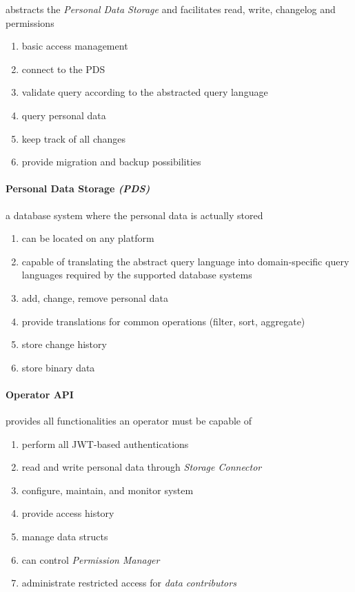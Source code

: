 \documentclass[12pt,english,a4paper,titlepage,cleardoublepage=empty,dottedtoc]{report}
\providecommand{\tightlist}{%
  \setlength{\itemsep}{0pt}\setlength{\parskip}{0pt}}
\begin{document}
abstracts the \emph{Personal Data Storage} and facilitates read, write,
changelog and permissions

\begin{enumerate}
\def\labelenumi{\alph{enumi})}
\tightlist
\item
  basic access management
\item
  connect to the PDS
\item
  validate query according to the abstracted query language
\item
  query personal data
\item
  keep track of all changes
\item
  provide migration and backup possibilities
\end{enumerate}

\paragraph{\texorpdfstring{Personal Data Storage
\emph{(PDS)}}{Personal Data Storage (PDS)}}\label{personal-data-storage-pds}

a database system where the personal data is actually stored

\begin{enumerate}
\def\labelenumi{\alph{enumi})}
\tightlist
\item
  can be located on any platform
\item
  capable of translating the abstract query language into
  domain-specific query languages required by the supported database
  systems
\item
  add, change, remove personal data
\item
  provide translations for common operations (filter, sort, aggregate)
\item
  store change history
\item
  store binary data
\end{enumerate}

\paragraph{Operator API}\label{operator-api-1}

provides all functionalities an operator must be capable of

\begin{enumerate}
\def\labelenumi{\alph{enumi})}
\tightlist
\item
  perform all JWT-based authentications
\item
  read and write personal data through \emph{Storage Connector}
\item
  configure, maintain, and monitor system
\item
  provide access history
\item
  manage data structs
\item
  can control \emph{Permission Manager}
\item
  administrate restricted access for \emph{data contributors}
\end{enumerate}
\end{document}
